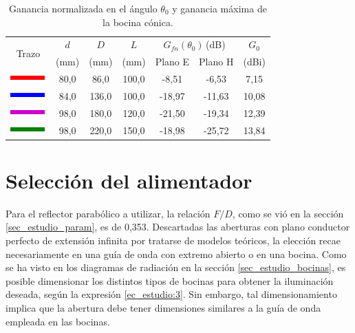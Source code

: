 \begin{table}[H]
\centering
\begin{tabular}{|c|c|c|c|c|c|c|}
\hline
\multirow{2}{*}{Trazo} & $d$ & $D$ & $L$ & \multicolumn{2}{c|}{$G_{fn}\left(\theta_0\right)\,$(dB)} & $G_0$ \\
\cline{5-6}
& (mm) & (mm) & (mm) & Plano E & Plano H & (dBi)\\
\hline
\includegraphics[scale = 1]{Figures/Estudio/linea_tabla_rojo} & 80,0 & 86,0 & 100,0 & -8,51 & -6,53 & 7,15 \\
\hline
\includegraphics[scale = 1]{Figures/Estudio/linea_tabla_azul} & 84,0 & 136,0 & 100,0 & -18,97 & -11,63 & 10,08 \\
\hline
\includegraphics[scale = 1]{Figures/Estudio/linea_tabla_violeta} & 98,0 & 180,0 & 120,0 & -21,50 & -19,34 & 12,39 \\
\hline
\includegraphics[scale = 1]{Figures/Estudio/linea_tabla_verde} & 98,0 & 220,0 & 150,0 & -18,98 & -25,72 & 13,84 \\
\hline
\end{tabular}
\caption{Ganancia normalizada en el ángulo $\theta_0$ y ganancia máxima de la bocina cónica.}
\label{tabla_estudio:10}
\end{table}

\section{Selección del alimentador}
\label{sec_selec_alim}

Para el reflector parabólico a utilizar, la relación $F/D$, como se vió en la sección \ref{sec_estudio_param}, es de 0,353. Descartadas las aberturas con plano conductor perfecto de extensión infinita por tratarse de modelos teóricos, la elección recae necesariamente en una guía de onda con extremo abierto o en una bocina. Como se ha visto en los diagramas de radiación en la sección \ref{sec_estudio_bocinas}, es posible dimensionar los distintos tipos de bocinas para obtener la iluminación deseada, según la expresión \eqref{ec_estudio:3}. Sin embargo, tal dimensionamiento implica que la abertura debe tener dimensiones similares a la guía de onda empleada en las bocinas.

